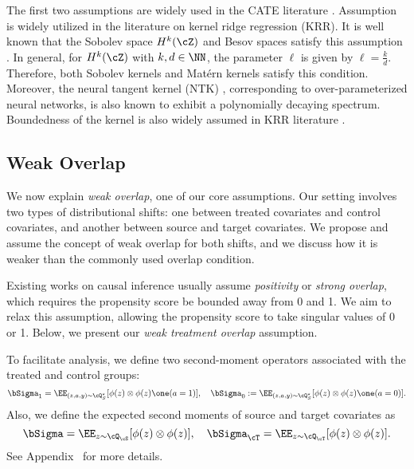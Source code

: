 \documentclass[12pt,a4paper,pdftex,onepage]{article}
\newcommand{\Sigmatreated}{\bSigma_{1}}
\newcommand{\Sigmacontrol}{\bSigma_{0}}
\begin{document}
The first two assumptions are widely used in the CATE literature \citep{kunzel2019metalearners,curth2021nonparametric,kennedy2020towards,kennedy2022minimax}. Assumption~ is widely utilized in the literature on kernel ridge regression (KRR).
It is well known that the Sobolev space \(H^k(\cZ)\) and Besov spaces satisfy this assumption \citep{wainwright2019high,fischer2020sobolev}.  
In general, for \(H^k(\cZ)\) with \(k,d \in \NN\), the parameter \(\ell\) is given by \(\ell = \frac{k}{d}\).  
Therefore, both Sobolev kernels and Matérn kernels satisfy this condition.
Moreover, the neural tangent kernel (NTK) \citep{li2024eigenvalue,bietti2020deep}, corresponding to over-parameterized neural networks, is also known to exhibit a polynomially decaying spectrum.
Boundedness of the kernel is also widely assumed in KRR literature \citep{wainwright2019high,fischer2020sobolev}. 


\subsection{Weak Overlap}\label{subsection; weak overlap}

We now explain \emph{weak overlap}, one of our core assumptions. 
Our setting involves two types of distributional shifts: one between treated covariates and control covariates, and another between source and target covariates. 
We propose and assume the concept of weak overlap for both shifts, and we discuss how it is weaker than the commonly used overlap condition.

Existing works on causal inference usually assume \emph{positivity} or \emph{strong overlap}, which requires the propensity score be bounded away from 0 and 1. We aim to relax this assumption, allowing the propensity score to take singular values of 0 or 1. Below, we present our \emph{weak treatment overlap} assumption.

To facilitate analysis, we define two second-moment operators associated with the treated and control groups:
\[
\Sigmatreated= \EE_{(z,a,y) \sim \cQ^\star_S}[\phi(z) \otimes \phi(z) \one(a =1)], 
\quad  
\Sigmacontrol := \EE_{(z,a,y) \sim \cQ^\star_S}[\phi(z) \otimes \phi(z) \one(a=0)].
\]
Also, we define the expected second moments of source and target covariates as 
\[
\bSigma  = \EE_{z \sim \cQ_\cS}[\phi(z) \otimes \phi(z)], 
\quad  
\bSigma_\cT = \EE_{z \sim \cQ_\cT} [\phi(z)\otimes \phi(z)].
\]
See Appendix~ for more details.
\end{document}
